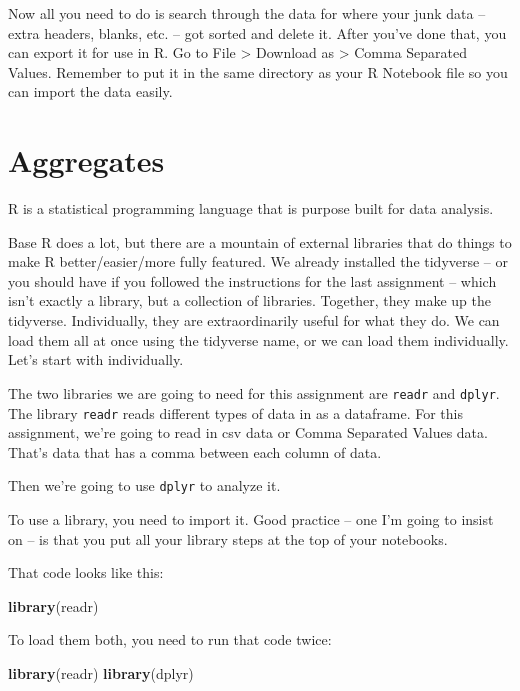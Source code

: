 \documentclass[
]{book}
\newenvironment{Shaded}{\begin{snugshade}}{\end{snugshade}}
\newcommand{\KeywordTok}[1]{\textcolor[rgb]{0.13,0.29,0.53}{\textbf{#1}}}
\newcommand{\NormalTok}[1]{#1}
\begin{document}
Now all you need to do is search through the data for where your junk data -- extra headers, blanks, etc. -- got sorted and delete it. After you've done that, you can export it for use in R. Go to File \textgreater{} Download as \textgreater{} Comma Separated Values. Remember to put it in the same directory as your R Notebook file so you can import the data easily.

\hypertarget{aggregates}{%
\chapter{Aggregates}\label{aggregates}}

R is a statistical programming language that is purpose built for data analysis.

Base R does a lot, but there are a mountain of external libraries that do things to make R better/easier/more fully featured. We already installed the tidyverse -- or you should have if you followed the instructions for the last assignment -- which isn't exactly a library, but a collection of libraries. Together, they make up the tidyverse. Individually, they are extraordinarily useful for what they do. We can load them all at once using the tidyverse name, or we can load them individually. Let's start with individually.

The two libraries we are going to need for this assignment are \texttt{readr} and \texttt{dplyr}. The library \texttt{readr} reads different types of data in as a dataframe. For this assignment, we're going to read in csv data or Comma Separated Values data. That's data that has a comma between each column of data.

Then we're going to use \texttt{dplyr} to analyze it.

To use a library, you need to import it. Good practice -- one I'm going to insist on -- is that you put all your library steps at the top of your notebooks.

That code looks like this:

\begin{Shaded}
\begin{Highlighting}[]
\KeywordTok{library}\NormalTok{(readr)}
\end{Highlighting}
\end{Shaded}

To load them both, you need to run that code twice:

\begin{Shaded}
\begin{Highlighting}[]
\KeywordTok{library}\NormalTok{(readr)}
\KeywordTok{library}\NormalTok{(dplyr)}
\end{Highlighting}
\end{Shaded}
\end{document}
